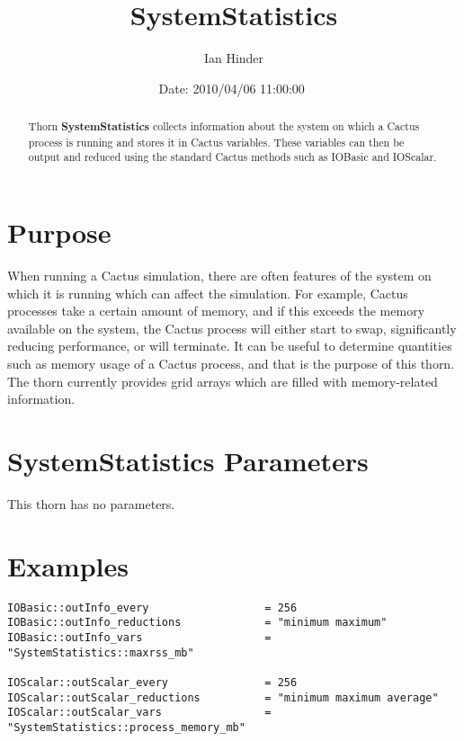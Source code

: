 \documentclass{article}
\begin{document}
\title{SystemStatistics}
\author{Ian Hinder}
\date{$ $Date: 2010/04/06 11:00:00 $ $}

\maketitle

\begin{abstract}
  Thorn {\bf SystemStatistics} collects information about the system
  on which a Cactus process is running and stores it in Cactus
  variables.  These variables can then be output and reduced using the
  standard Cactus methods such as IOBasic and IOScalar.
\end{abstract}


\section{Purpose}
When running a Cactus simulation, there are often features of the
system on which it is running which can affect the simulation.  For
example, Cactus processes take a certain amount of memory, and if
this exceeds the memory available on the system, the Cactus process
will either start to swap, significantly reducing performance, or will
terminate.  It can be useful to determine quantities such as memory
usage of a Cactus process, and that is the purpose of this thorn.
%
The thorn currently provides grid arrays which are filled with
memory-related information.

\section{{\bf SystemStatistics} Parameters}
%
This thorn has no parameters.
%
%
\section{Examples}
%
\begin{verbatim}
IOBasic::outInfo_every                  = 256
IOBasic::outInfo_reductions             = "minimum maximum"
IOBasic::outInfo_vars                   = "SystemStatistics::maxrss_mb"

IOScalar::outScalar_every               = 256
IOScalar::outScalar_reductions          = "minimum maximum average"
IOScalar::outScalar_vars                = "SystemStatistics::process_memory_mb"
\end{verbatim}
\end{document}
